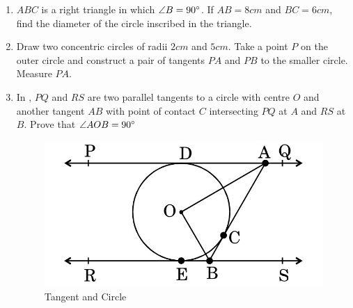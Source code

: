 \begin{enumerate}
\item $ABC$ is a right triangle in which $\angle B = 90\degree$. If $AB = 8 cm$ and $BC = 6 cm$, find the diameter of the circle inscribed in the triangle.

\item Draw two concentric circles of radii $2 cm$ and $5 cm$. Take a point $P$ on the outer circle and construct a pair of tangents $PA$ and $PB$ to the smaller circle. Measure $PA$.  


\item In  , $PQ$ and $RS$ are two parallel tangents to a circle with centre $O$ and another tangent $AB$ with point of contact $C$ intersecting $PQ$ at $A$ and $RS$ at $B$. Prove that $\angle AOB = 90 \degree$
\begin{figure}[H]
    \centering
    \includegraphics[width=\columnwidth]{figs/img3.jpg}
    \caption{Tangent and Circle}
    \label{fig:Figh_3}
\end{figure}
\end{enumerate}
